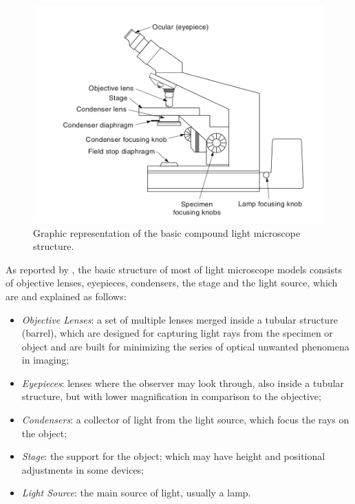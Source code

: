 \begin{figure}[H]
	\centering
	\caption{\label{fig:compound_microscope} Graphic representation of the basic compound light microscope structure.}
	\begin{center}
	    \includegraphics[scale=0.4]{images/fig5.png}
	\end{center}
	\centering
\end{figure}

As reported by , the basic structure of most of light microscope models consists of objective lenses, eyepieces, condensers, the stage and the light source, which are and explained as follows:

\begin{itemize}
    
    \item \emph{Objective Lenses}: a set of multiple lenses merged inside a tubular structure (barrel), which are designed for capturing light rays from the specimen or object and are built for minimizing the series of optical unwanted phenomena in imaging;

    \item \emph{Eyepieces}: lenses where the observer may look through, also inside a tubular structure, but with lower magnification in comparison to the objective;

    \item \emph{Condensers}: a collector of light from the light source, which focus the rays on the object;
    
    \item \emph{Stage}: the support for the object; which may have height and positional adjustments in some devices;
    
    \item \emph{Light Source}: the main source of light, usually a lamp.
\end{itemize}

